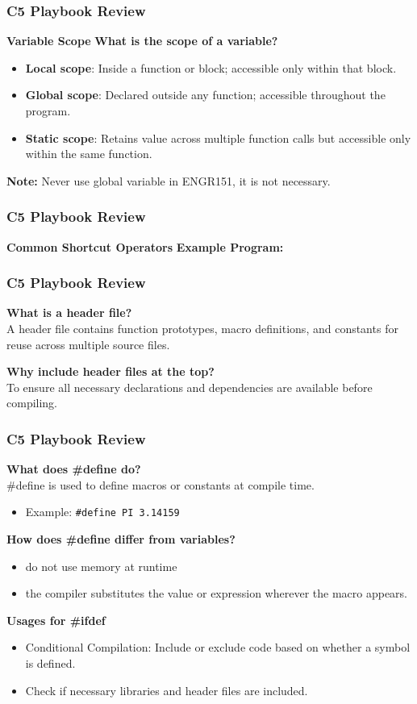 \documentclass[
	11pt, %
]{beamer}
\begin{document}
	\begin{frame}
		\frametitle{C5 Playbook Review}
		\textbf{Variable Scope}
	\textbf{What is the scope of a variable?}
	\begin{itemize}
		\item \textbf{Local scope}: Inside a function or block; accessible only within that block.
		\item \textbf{Global scope}: Declared outside any function; accessible throughout the program.
		\item \textbf{Static scope}: Retains value across multiple function calls but accessible only within the same function.
	\end{itemize}
	
	\textbf{Note:} Never use global variable in ENGR151, it is not necessary.
	\end{frame}
	
	\begin{frame}
		\frametitle{C5 Playbook Review}
		\textbf{Common Shortcut Operators}
	\textbf{Example Program:}
	\end{frame}
	
	\begin{frame}
	\frametitle{C5 Playbook Review}
	\textbf{What is a header file?} \\
	A header file contains function prototypes, macro definitions, and constants for reuse across multiple source files.
	
	\textbf{Why include header files at the top?} \\
	To ensure all necessary declarations and dependencies are available before compiling.
	
	\end{frame}
	
	\begin{frame}
	\frametitle{C5 Playbook Review}
	\textbf{What does \#define do?} \\
	\#define is used to define macros or constants at compile time.
	\begin{itemize}
		\item Example: \texttt{\#define PI 3.14159}
	\end{itemize}
	
	\textbf{How does \#define differ from variables?} \\
	\begin{itemize}
		\item do not use memory at runtime
		\item  the compiler substitutes the value or expression wherever the macro appears.
	\end{itemize}
	
	\textbf{Usages for \#ifdef}

	\begin{itemize}
		\item Conditional Compilation: Include or exclude code based on whether a symbol is defined.
		\item Check if necessary libraries and header files are included.
	\end{itemize}
	\end{frame}
	
\end{document}
